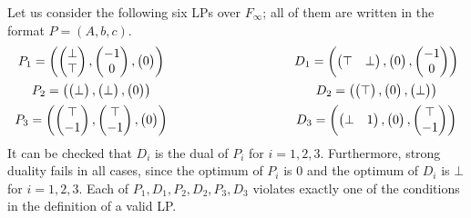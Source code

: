 \documentclass[]{article}
\renewcommand{\.}{\hskip .75pt}
\begin{document}
Let us consider the following six LPs over $F_\infty$;
all of them are written in the format $P=(A,b,c)$.
$$
\begin{array}{c@{\hspace{100pt}}c}
P_1 = \left(
	\begin{pmatrix} \bot \\ \top \end{pmatrix},
	\begin{pmatrix} -1 \\ 0 \end{pmatrix},
	\begin{pmatrix} 0 \end{pmatrix}
\right)
&
D_1 = \left(
	\begin{pmatrix} \top & \bot \end{pmatrix},
	\begin{pmatrix} 0 \end{pmatrix},
	\begin{pmatrix} -1 \\ 0 \end{pmatrix}
\right)
\vspace{5pt} \\
P_2=\left(
	\begin{pmatrix} \bot \end{pmatrix}, 
	\begin{pmatrix} \bot \end{pmatrix}, 
	\begin{pmatrix} 0 \end{pmatrix}
\right)
&
D_2=\left(
	\begin{pmatrix} \top \end{pmatrix},
	\begin{pmatrix} 0 \end{pmatrix},
	\begin{pmatrix} \bot \end{pmatrix}
\right)
\vspace{5pt} \\
P_3=\left(
	\begin{pmatrix} \top \\ -1 \end{pmatrix},
	\begin{pmatrix} \top \\ -1 \end{pmatrix},
	\begin{pmatrix} 0 \end{pmatrix}
\right)
&
D_3=\left(
	\begin{pmatrix} \bot & 1 \end{pmatrix},
	\begin{pmatrix} 0 \end{pmatrix},
	\begin{pmatrix} \top \\ -1 \end{pmatrix}
\right)
\end{array}
$$
It can be checked that $D_i$ is the dual of $P_i$ for $i=1,2,3$.
Furthermore, strong duality fails in all cases, since
the optimum of $P_i$ is $0$ and the optimum of $D_i$ is $\bot$ for $i=1,2,3$.
Each of $P_1,D_1,P_2,D_2,P_3,D_3$ violates exactly one of the conditions
in the definition of a valid LP.
\end{document}
